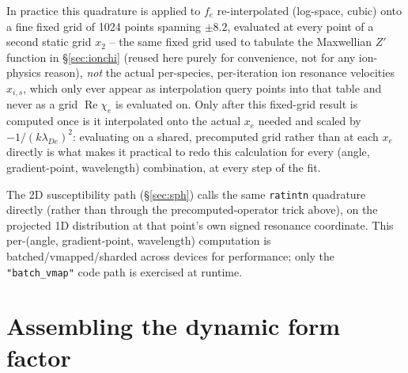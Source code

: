 \documentclass[11pt]{article}
\newcommand{\code}[1]{\texttt{#1}}
\begin{document}
In practice this quadrature is applied to $f_e$ re-interpolated (log-space, cubic) onto a
fine fixed grid of 1024 points spanning $\pm8.2$, evaluated at every point of a second
static grid $x_2$ -- the same fixed grid used to tabulate the Maxwellian $Z'$ function
in \S\ref{sec:ionchi} (reused here purely for convenience, not for any ion-physics
reason), \emph{not} the actual per-species, per-iteration ion resonance velocities
$x_{i,s}$, which only ever appear as interpolation query points into that table and
never as a grid $\operatorname{Re}\chi_e$ is evaluated on. Only after this fixed-grid
result is computed once is it interpolated onto the actual $x_e$ needed and scaled by
$-1/(k\lambda_{De})^2$: evaluating on a shared,
precomputed grid rather than at each $x_e$ directly is what makes it practical to redo
this calculation for every (angle, gradient-point, wavelength) combination, at every step
of the fit.

The 2D susceptibility path (\S\ref{sec:sph}) calls the same \code{ratintn} quadrature
directly (rather than through the precomputed-operator trick above), on the projected 1D
distribution at that point's own signed resonance coordinate. This per-(angle,
gradient-point, wavelength) computation is batched/vmapped/sharded across devices for
performance; only the \code{"batch\_vmap"} code path is exercised at runtime.

\section{Assembling the dynamic form factor}\label{sec:assemble}
\end{document}
